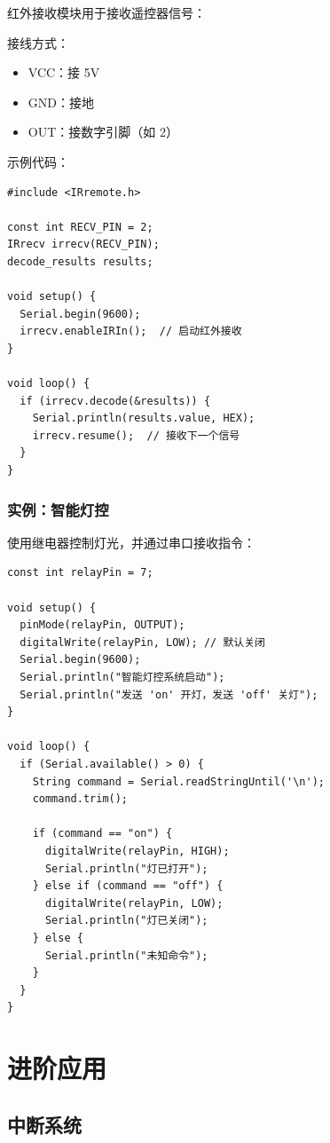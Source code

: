 \documentclass[12pt,UTF8]{ctexbook}
\begin{document}
红外接收模块用于接收遥控器信号：

接线方式：
\begin{itemize}
    \item VCC：接 5V
    \item GND：接地
    \item OUT：接数字引脚（如 2）
\end{itemize}

示例代码：
\begin{lstlisting}
#include <IRremote.h>

const int RECV_PIN = 2;
IRrecv irrecv(RECV_PIN);
decode_results results;

void setup() {
  Serial.begin(9600);
  irrecv.enableIRIn();  // 启动红外接收
}

void loop() {
  if (irrecv.decode(&results)) {
    Serial.println(results.value, HEX);
    irrecv.resume();  // 接收下一个信号
  }
}
\end{lstlisting}

\section{实例：智能灯控}

使用继电器控制灯光，并通过串口接收指令：

\begin{lstlisting}
const int relayPin = 7;

void setup() {
  pinMode(relayPin, OUTPUT);
  digitalWrite(relayPin, LOW); // 默认关闭
  Serial.begin(9600);
  Serial.println("智能灯控系统启动");
  Serial.println("发送 'on' 开灯，发送 'off' 关灯");
}

void loop() {
  if (Serial.available() > 0) {
    String command = Serial.readStringUntil('\n');
    command.trim();
    
    if (command == "on") {
      digitalWrite(relayPin, HIGH);
      Serial.println("灯已打开");
    } else if (command == "off") {
      digitalWrite(relayPin, LOW);
      Serial.println("灯已关闭");
    } else {
      Serial.println("未知命令");
    }
  }
}
\end{lstlisting}

\part{进阶应用}

\chapter{中断系统}
\end{document}
